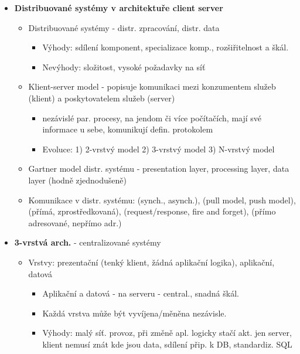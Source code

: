 \documentclass[a4paper,hidelinks]{article}
\begin{document}
\begin{itemize}
    \item \textbf{Distribuované systémy v architektuře client server}
        \begin{itemize}
            \item Distribuované systémy - distr. zpracování, distr. data
                \begin{itemize}
                    \item Výhody: sdílení komponent, specializace komp., rozšiřitelnost a škál.
                    \item Nevýhody: složitost, vysoké požadavky na síť
                \end{itemize}
            \item Klient-server model - popisuje komunikaci mezi konzumentem služeb (klient) a poskytovatelem služeb (server)
                \begin{itemize}
                    \item nezávislé par. procesy, na jendom či více počítačích, mají své informace u sebe, komunikují defin. protokolem
                    \item Evoluce: 1) 2-vrstvý model 2) 3-vrstvý model 3) N-vrstvý model
                \end{itemize}
            \item Gartner model distr. systému - presentation layer, processing layer, data layer (hodně zjednodušeně)
            \item Komunikace v distr. systému: (synch., asynch.), (pull model, push model), (přímá, zprostředkovaná), (request/response, fire and forget), (přímo adresované, nepřímo adr.)
        \end{itemize}
    \item \textbf{3-vrstvá arch.} - centralizované systémy
        \begin{itemize}
            \item Vrstvy: prezentační (tenký klient, žádná aplikační logika), aplikační, datová
                \begin{itemize}
                    \item Aplikační a datová - na serveru - central., snadná škál.
                    \item Každá vrstva může být vyvíjena/měněna nezávisle.
                    \item Výhody: malý síť. provoz, při změně apl. logicky stačí akt. jen server, klient nemusí znát kde jsou data, sdílení přip. k DB, standardiz. SQL

\end{itemize}
\end{itemize}
\end{itemize}
\end{document}
